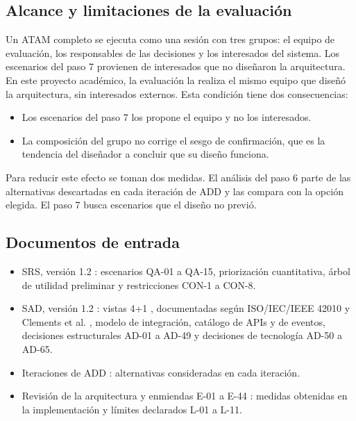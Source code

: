 \documentclass[11pt,letterpaper]{article}
\begin{document}
\subsection{Alcance y limitaciones de la evaluación}

Un ATAM completo se ejecuta como una sesión con tres grupos: el equipo de evaluación, los
responsables de las decisiones y los interesados del sistema. Los escenarios del paso 7 provienen
de interesados que no diseñaron la arquitectura. En este proyecto académico, la evaluación la
realiza el mismo equipo que diseñó la arquitectura, sin interesados externos. Esta condición tiene
dos consecuencias:

\begin{itemize}
  \item Los escenarios del paso 7 los propone el equipo y no los interesados.
  \item La composición del grupo no corrige el sesgo de confirmación, que es la tendencia del
        diseñador a concluir que su diseño funciona.
\end{itemize}

Para reducir este efecto se toman dos medidas. El análisis del paso 6 parte de las alternativas
descartadas en cada iteración de ADD y las compara con la opción elegida. El paso 7 busca
escenarios que el diseño no previó.

\subsection{Documentos de entrada}

\begin{itemize}
  \item SRS, versión 1.2 \cite{srs}: escenarios QA-01 a QA-15, priorización cuantitativa, árbol de
        utilidad preliminar y restricciones CON-1 a CON-8.
  \item SAD, versión 1.2 \cite{sad}: vistas 4+1 \cite{kruchten}, documentadas según
        ISO/IEC/IEEE 42010 \cite{iso42010} y Clements et al. \cite{clements}, modelo de integración,
        catálogo de APIs y de eventos, decisiones estructurales AD-01 a AD-49 y decisiones de
        tecnología AD-50 a AD-65.
  \item Iteraciones de ADD \cite{iteraciones}: alternativas consideradas en cada iteración.
  \item Revisión de la arquitectura y enmiendas E-01 a E-44 \cite{revision}: medidas obtenidas en la
        implementación y límites declarados L-01 a L-11.
\end{itemize}
\end{document}
